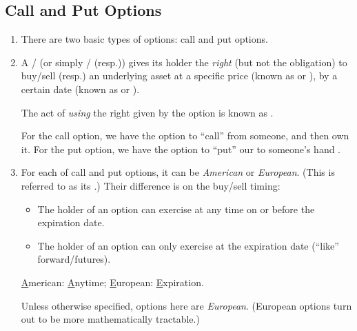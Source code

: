 \subsection{Call and Put Options}
\begin{enumerate}
\item There are two basic types of options: call and put options.

\item A / (or simply /
(resp.))  gives its holder the \emph{right} (but not the
obligation) to buy/sell (resp.) an underlying asset  at a
specific price (known as  or ), by a
certain date (known as  or ).

\begin{note}
The act of \emph{using} the right given by the option is known as
.
\end{note}

\begin{mnemonic}
For the call option, we have the option to ``call''  from
someone, and then own it. For the put option, we have the option to ``put'' our
 to someone's hand .
\end{mnemonic}

\item For each of call and put options, it can be \emph{American} or
\emph{European}. (This is referred to as its .) Their
difference is on the buy/sell timing:
\begin{itemize}
\item The holder of an  option can exercise at any time on or before the expiration date.
\item The holder of an  option can only exercise at the expiration date (``like'' forward/futures).
\end{itemize}
\begin{mnemonic}
\underline{A}merican: \underline{A}nytime; \underline{E}uropean: \underline{E}xpiration.
\end{mnemonic}

\begin{note}
Unless otherwise specified, options here are \emph{European}. (European options
turn out to be more mathematically tractable.)
\end{note}


\end{enumerate}

